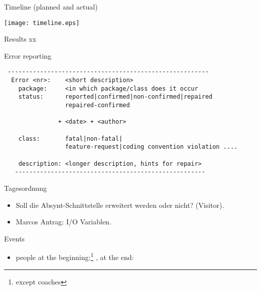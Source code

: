 \begin{myslide}{Timeline (planned and actual)}
  \begin{center}
    \texttt{[image: timeline.eps]}  
    \end{center}
\end{myslide}



\begin{myslide}{Results}
  xx
\end{myslide}


\begin{myslide}{Error reporting}
{\footnotesize 

\begin{verbatim}
 --------------------------------------------------------
  Error <nr>:    <short description>
    package:     <in which package/class does it occur
    status:      reported|confirmed|non-confirmed|repaired
                 repaired-confirmed

               + <date> + <author>
   
    class:       fatal|non-fatal|
                 feature-request|coding convention violation ....

    description: <longer description, hints for repair>
   -----------------------------------------------------

\end{verbatim}
}
\end{myslide}
\begin{myslide}{Tagesordnung}
  \begin{itemize}
  \item Soll die Absynt-Schnittstelle erweitert werden oder nicht?
    (Visitor).
  \item Marcos Antrag: I/O Variablen.
  \end{itemize}
  
\end{myslide}

\begin{myslide}{Events}
  \begin{itemize}
  \item people at the beginning:\footnote{except coaches} ,
    at the end: 
  \end{itemize}
\end{myslide}


